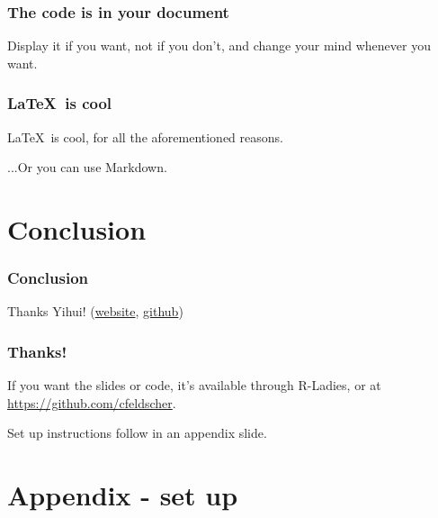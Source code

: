 \documentclass[dvipsnames]{beamer}\usepackage[]{graphicx}\usepackage[]{color}
\begin{document}
%

\begin{frame}[fragile]
  \frametitle{The code is in your document}
  
  Display it if you want, not if you don't, and change your mind whenever you want.
  
\end{frame}

%

\begin{frame}[fragile]
  \frametitle{\LaTeX\ is cool}
  
  \LaTeX\ is cool, for all the aforementioned reasons.\pause
  
  ...Or you can use Markdown.
  
\end{frame}

%

\section{Conclusion}

%

\begin{frame}[fragile]
  \frametitle{Conclusion}
  
  Thanks Yihui! (\href{https://yihui.name/knitr/}{\color{violet}website}, \href{https://github.com/yihui/knitr}{\color{violet}github})
  
\end{frame}

%

\begin{frame}[fragile]
  \frametitle{Thanks!}
  
  If you want the slides or code, it's available through R-Ladies, or at \href{https://github.com/cfeldscher}{\color{violet}https://github.com/cfeldscher}.
  
  Set up instructions follow in an appendix slide.
  
\end{frame}

%

\section*{Appendix - set up}

%
\end{document}

